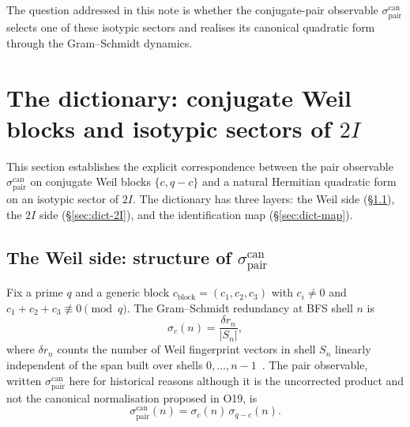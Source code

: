 \documentclass[12pt,a4paper]{article}
\theoremstyle{definition}
\theoremstyle{remark}
\begin{document}
  The question addressed in this note is whether the conjugate-pair observable
  $\sigma^{\mathrm{can}}_{\mathrm{pair}}$ selects one of these isotypic sectors and
  realises its canonical quadratic form through the Gram--Schmidt dynamics.

  \section{The dictionary: conjugate Weil blocks and isotypic sectors of $2I$}
  \label{sec:dictionary}

  This section establishes the explicit correspondence between the pair observable
  $\sigma^{\mathrm{can}}_{\mathrm{pair}}$ on conjugate Weil blocks $\{c, q-c\}$
  and a natural Hermitian quadratic form on an isotypic sector of $2I$.
  The dictionary has three layers: the Weil side (§\ref{sec:dict-weil}),
  the $2I$ side (§\ref{sec:dict-2I}), and the identification map (§\ref{sec:dict-map}).

  \subsection{The Weil side: structure of $\sigma^{\mathrm{can}}_{\mathrm{pair}}$}
    \label{sec:dict-weil}

    Fix a prime $q$ and a generic block $c_{\mathrm{block}} = (c_1, c_2, c_3)$
    with $c_i \neq 0$ and $c_1 + c_2 + c_3 \not\equiv 0 \pmod{q}$.
    The Gram--Schmidt redundancy at BFS shell $n$ is
    \begin{equation}
      \sigma_c(n) = \frac{\delta r_n}{|S_n|},
    \end{equation}
    where $\delta r_n$ counts the number of Weil fingerprint vectors in shell $S_n$
    linearly independent of the span built over shells $0, \ldots, n-1$~\cite{Beau2026a16}.
    The pair observable, written $\sigma^{\mathrm{can}}_{\mathrm{pair}}$ here for historical
    reasons although it is the uncorrected product and not the canonical normalisation proposed
    in O19, is
    \begin{equation}
      \sigma^{\mathrm{can}}_{\mathrm{pair}}(n) = \sigma_c(n)\,\sigma_{q-c}(n).
    \end{equation}
\end{document}
